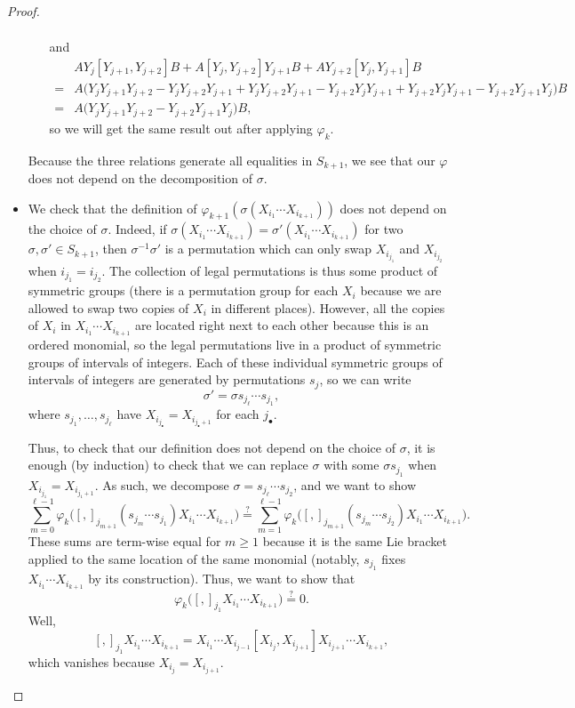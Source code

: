 \documentclass[../notes.tex]{subfiles}
\begin{document}
\begin{proof}
\begin{itemize}
\begin{itemize}
\begin{align*}
			\end{align*}
			and
			\begin{align*}
				& AY_j[Y_{j+1},Y_{j+2}]B + A[Y_j,Y_{j+2}]Y_{j+1}B + AY_{j+2}[Y_{j},Y_{j+1}]B \\
				={}& A\big(Y_jY_{j+1}Y_{j+2}-Y_jY_{j+2}Y_{j+1} + Y_jY_{j+2}Y_{j+1}-Y_{j+2}Y_jY_{j+1} + Y_{j+2}Y_jY_{j+1}-Y_{j+2}Y_{j+1}Y_j\big)B \\
				={}& A\big(Y_jY_{j+1}Y_{j+2}-Y_{j+2}Y_{j+1}Y_j\big)B,
			\end{align*}
			so we will get the same result out after applying $\varphi_k$.
		\end{itemize}
		Because the three relations generate all equalities in $S_{k+1}$, we see that our $\varphi$ does not depend on the decomposition of $\sigma$.

		\item We check that the definition of $\varphi_{k+1}\left(\sigma(X_{i_1}\cdots X_{i_{k+1}})\right)$ does not depend on the choice of $\sigma$. Indeed, if $\sigma(X_{i_1}\cdots X_{i_{k+1}})=\sigma'(X_{i_1}\cdots X_{i_{k+1}})$ for two $\sigma,\sigma'\in S_{k+1}$, then $\sigma^{-1}\sigma'$ is a permutation which can only swap $X_{i_{j_1}}$ and $X_{i_{j_2}}$ when $i_{j_1}=i_{j_2}$. The collection of legal permutations is thus some product of symmetric groups (there is a permutation group for each $X_i$ because we are allowed to swap two copies of $X_i$ in different places). However, all the copies of $X_i$ in $X_{i_1}\cdots X_{i_{k+1}}$ are located right next to each other because this is an ordered monomial, so the legal permutations live in a product of symmetric groups of intervals of integers. Each of these individual symmetric groups of intervals of integers are generated by permutations $s_j$, so we can write
		\[\sigma'=\sigma s_{j_\ell}\cdots s_{j_1},\]
		where $s_{j_1},\ldots,s_{j_\ell}$ have $X_{i_{j_\bullet}}=X_{i_{j_\bullet+1}}$ for each $j_\bullet$.
		
		Thus, to check that our definition does not depend on the choice of $\sigma$, it is enough (by induction) to check that we can replace $\sigma$ with some $\sigma s_{j_1}$ when $X_{i_{j_1}}=X_{i_{j_1+1}}$. As such, we decompose $\sigma=s_{j_\ell}\cdots s_{j_2}$, and we want to show
		\[\sum_{m=0}^{\ell-1}\varphi_k\big([,]_{j_{m+1}}(s_{j_m}\cdots s_{j_1})X_{i_1}\cdots X_{i_{k+1}}\big)\stackrel?=\sum_{m=1}^{\ell-1}\varphi_k\big([,]_{j_{m+1}}(s_{j_m}\cdots s_{j_2})X_{i_1}\cdots X_{i_{k+1}}\big).\]
		These sums are term-wise equal for $m\ge1$ because it is the same Lie bracket applied to the same location of the same monomial (notably, $s_{j_1}$ fixes $X_{i_1}\cdots X_{i_{k+1}}$ by its construction). Thus, we want to show that
		\[\varphi_k\big([,]_{j_{1}}X_{i_1}\cdots X_{i_{k+1}}\big)\stackrel?=0.\]
		Well,
		\[[,]_{j_{1}}X_{i_1}\cdots X_{i_{k+1}}=X_{i_1}\cdots X_{i_{j-1}}[X_{i_j},X_{i_{j+1}}]X_{i_{j+1}}\cdots X_{i_{k+1}},\]
		which vanishes because $X_{i_j}=X_{i_{j+1}}$.
		

\end{itemize}
\end{proof}
\end{document}
